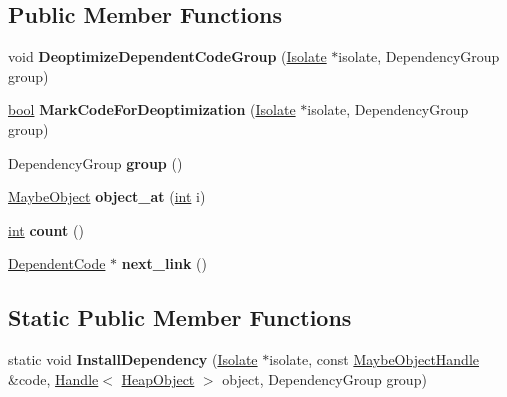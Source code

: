 \subsection*{Public Member Functions}
\begin{DoxyCompactItemize}
\item 
\mbox{\label{classv8_1_1internal_1_1DependentCode_a1c704fdb8d804bfc536477100246768c}} 
void {\bfseries Deoptimize\+Dependent\+Code\+Group} (\mbox{\hyperlink{classv8_1_1internal_1_1Isolate}{Isolate}} $\ast$isolate, Dependency\+Group group)
\item 
\mbox{\label{classv8_1_1internal_1_1DependentCode_a05a9f6512e52b8238a3da21842f36009}} 
\mbox{\hyperlink{classbool}{bool}} {\bfseries Mark\+Code\+For\+Deoptimization} (\mbox{\hyperlink{classv8_1_1internal_1_1Isolate}{Isolate}} $\ast$isolate, Dependency\+Group group)
\item 
\mbox{\label{classv8_1_1internal_1_1DependentCode_a5380e41c40fc535ac25c03dd8edf19cd}} 
Dependency\+Group {\bfseries group} ()
\item 
\mbox{\label{classv8_1_1internal_1_1DependentCode_ae0e295bbc29a2cd4550bd7b046356d1c}} 
\mbox{\hyperlink{classv8_1_1internal_1_1MaybeObject}{Maybe\+Object}} {\bfseries object\+\_\+at} (\mbox{\hyperlink{classint}{int}} i)
\item 
\mbox{\label{classv8_1_1internal_1_1DependentCode_adcf6e16bc085d6c6b00ca0c347ac1861}} 
\mbox{\hyperlink{classint}{int}} {\bfseries count} ()
\item 
\mbox{\label{classv8_1_1internal_1_1DependentCode_aca2d708affdfbeb57280b5f5eb9f478c}} 
\mbox{\hyperlink{classv8_1_1internal_1_1DependentCode}{Dependent\+Code}} $\ast$ {\bfseries next\+\_\+link} ()
\end{DoxyCompactItemize}
\subsection*{Static Public Member Functions}
\begin{DoxyCompactItemize}
\item 
\mbox{\label{classv8_1_1internal_1_1DependentCode_a68d3ff4a2b19b702a0ba9a77d4789bc7}} 
static void {\bfseries Install\+Dependency} (\mbox{\hyperlink{classv8_1_1internal_1_1Isolate}{Isolate}} $\ast$isolate, const \mbox{\hyperlink{classv8_1_1internal_1_1MaybeObjectHandle}{Maybe\+Object\+Handle}} \&code, \mbox{\hyperlink{classv8_1_1internal_1_1Handle}{Handle}}$<$ \mbox{\hyperlink{classv8_1_1internal_1_1HeapObject}{Heap\+Object}} $>$ object, Dependency\+Group group)
\end{DoxyCompactItemize}
